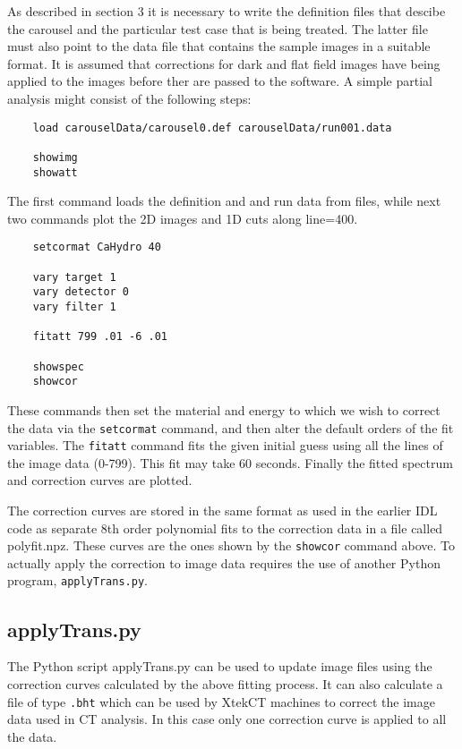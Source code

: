 \documentclass[a4paper]{article}
\begin{document}
As described in section 3 it is necessary to write the definition files that descibe the carousel and the particular
test case that is being treated.
The latter file must also point to the data file that contains the sample images in a suitable format.
It is assumed that corrections for dark and flat field images have being applied to the images before ther are
passed to the software.
A simple partial analysis might consist of the following steps:
\begin{verbatim}
    load carouselData/carousel0.def carouselData/run001.data

    showimg
    showatt
\end{verbatim}
The first command loads the definition and and run data from files, while next two commands
plot the 2D images and 1D cuts along line=400.

\begin{verbatim}
    setcormat CaHydro 40

    vary target 1
    vary detector 0
    vary filter 1

    fitatt 799 .01 -6 .01

    showspec
    showcor
\end{verbatim}
These commands then set the material and energy to which we wish to correct the data via the \texttt{setcormat}
command, and then alter the default orders of the fit variables.
The \texttt{fitatt} command fits the given initial guess using all the lines of the image data (0-799).
This fit may take 60 seconds. Finally the fitted spectrum and correction curves are plotted.

The correction curves are stored in the same format as used in the earlier IDL code as separate 8th order polynomial
fits to the correction data in a file called polyfit.npz.
These curves are the ones shown by the \texttt{showcor} command above.
To actually apply the correction to image data requires the use of another Python program, \texttt{applyTrans.py}.

\subsection{applyTrans.py}

The Python script applyTrans.py can be used to update image files using the correction curves calculated by
the above fitting process.
It can also calculate a file of type \texttt{.bht} which can be used by XtekCT machines to correct the image
data used in CT analysis. In this case only one correction curve is applied to all the data.
\end{document}
